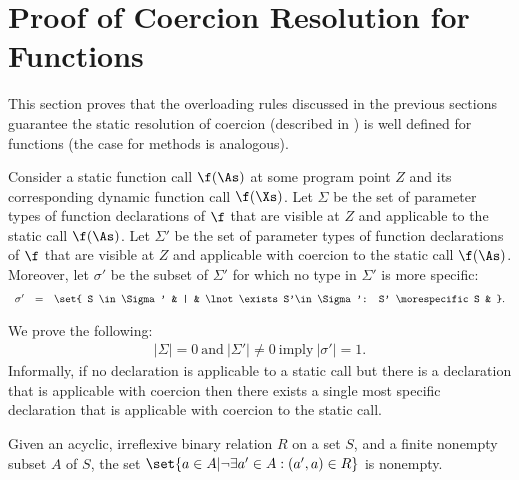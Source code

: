 %
%
%
%

\section{Proof of Coercion Resolution for Functions}

This section proves that the overloading rules discussed in the previous
sections guarantee the static resolution of coercion
(described in ) is well defined for functions
(the case for methods is analogous).

Consider a static function call $\f(\As)$ at some program point $Z$
and its corresponding dynamic function call $\f(\Xs)$.  Let $\Sigma$
be the set of parameter types of function declarations of $\f$ that
are visible at $Z$ and applicable to the static call $\f(\As)$.  Let
$\Sigma'$ be the set of parameter types of function declarations of
$\f$ that are visible at $Z$ and applicable with coercion to the
static call $\f(\As)$.  Moreover, let $\sigma'$ be the subset of
$\Sigma'$ for which no type in $\Sigma'$ is more specific:
\[
\begin{array}{lclcll}
\sigma' & = & \set{ S \in\Sigma' & | & \lnot \exists S'\in\Sigma': S' \morespecific S & }.
\end{array}
\]

We prove the following:
\[
\begin{array}{l}
|\Sigma| = 0 \ \text{and} \ |\Sigma'| \neq 0 \ \text{imply} \ |\sigma'| = 1.
\end{array}
\]
Informally, if no declaration is applicable to a static call but there
is a declaration that is applicable with coercion then there exists a
single most specific declaration that is applicable with coercion to
the static call.
\\
\begin{lemma}
\label{lem:nonempty}
Given an acyclic, irreflexive binary relation $R$ on a set $S$, and a
finite nonempty subset $A$ of $S$, the set $\set{a \in A| \lnot
\exists a' \in A : (a',a) \in R}$ is nonempty.
\end{lemma}

